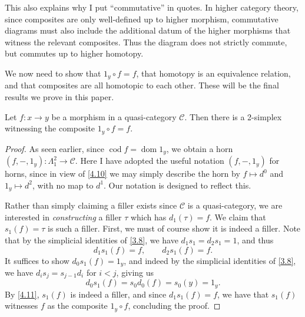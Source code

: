 This also explains why I put ``commutative'' in quotes. In higher category theory, since composites are only well-defined up to higher morphism, commutative diagrams must also include the additional datum of the higher morphisms that witness the relevant composites. Thus the diagram does not strictly commute, but commutes up to higher homotopy.

We now need to show that $1_y\circ f=f$, that homotopy is an equivalence relation, and that composites are all homotopic to each other. These will be the final results we prove in this paper.

\begin{proposition}\label{5.4}
	Let $f : x \to y$ be a morphism in a quasi-category $\mathcal{C} $. Then there is a 2-simplex witnessing the composite $1_y\circ f=f$.
\end{proposition}
\begin{proof}
	As seen earlier, since $\operatorname{cod} f=\operatorname{dom} 1_y$, we obtain a horn $(f,-,1_y): \Lambda _1^2 \to \mathcal{C} $. Here I have adopted the useful notation $(f,-,1_y)$ for horns, since in view of \cref{4.10} we may simply describe the horn by $f\mapsto d^0$ and $1_y \mapsto d^2$, with no map to $d^1$. Our notation is designed to reflect this.

	Rather than simply claiming a filler exists since $\mathcal{C} $ is a quasi-category, we are interested in \emph{constructing} a filler $\tau $ which has $d_1(\tau )=f$. We claim that $s_1(f)=\tau $ is such a filler. First, we must of course show it is indeed a filler. Note that by the simplicial identities of \cref{3.8}, we have $d_1s_1=d_2s_1=1$, and thus
	\[
		d_1s_1(f)=f,\qquad d_2s_1(f)=f
	.\]
	It suffices to show $d_0s_1(f)=1_y$, and indeed by the simplicial identities of \cref{3.8}, we have $d_is_j=s_{j-1} d_{i} $ for $i<j$, giving us
	\[
		d_0s_1(f)=s_0d_0(f)=s_0(y)=1_y
	.\]
	By \cref{4.11}, $s_1(f)$ is indeed a filler, and since $d_1s_1(f)=f$, we have that $s_1(f)$ witnesses $f$ as the composite $1_y\circ f$, concluding the proof.
\end{proof}

